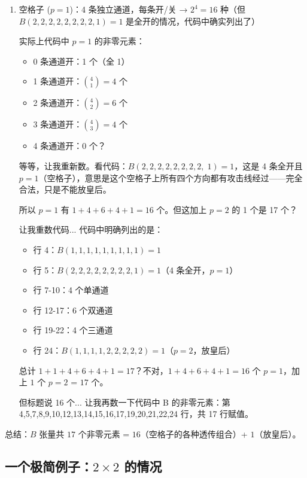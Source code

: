 \documentclass[12pt,a4paper]{article}
\begin{document}
\begin{sumbox}[16 个非零元素 = 15（空格子透传）+ 1（放皇后）]
\begin{enumerate}
  \item 空格子 ($p=1$)：4 条独立通道，每条开/关 → $2^4 = 16$ 种（但 $B(2,2,2,2,2,2,2,2,1)=1$ 是全开的情况，代码中确实列出了）

  实际上代码中 $p=1$ 的非零元素：
  \begin{itemize}
    \item 0 条通道开：1 个（全 1）
    \item 1 条通道开：$\binom{4}{1} = 4$ 个
    \item 2 条通道开：$\binom{4}{2} = 6$ 个
    \item 3 条通道开：$\binom{4}{3} = 4$ 个
    \item 4 条通道开：$0$ 个？
  \end{itemize}

  等等，让我重新数。看代码：$B(2,2,2,2,2,2,2,2,\;1) = 1$，这是 4 条全开且 $p=1$（空格子），意思是这个空格子上所有四个方向都有攻击线经过——完全合法，只是不能放皇后。

  所以 $p=1$ 有 $1 + 4 + 6 + 4 + 1 = 16$ 个。但这加上 $p=2$ 的 1 个是 17 个？

  让我重数代码... 代码中明确列出的是：
  \begin{itemize}
    \item 行 4：$B(1,1,1,1,1,1,1,1,1)=1$
    \item 行 5：$B(2,2,2,2,2,2,2,2,1)=1$（4 条全开，$p=1$）
    \item 行 7-10：4 个单通道
    \item 行 12-17：6 个双通道
    \item 行 19-22：4 个三通道
    \item 行 24：$B(1,1,1,1,2,2,2,2,2)=1$（$p=2$，放皇后）
  \end{itemize}
  总计 $1+1+4+6+4+1 = 17$？不对，$1+4+6+4+1 = 16$ 个 $p=1$，加上 $1$ 个 $p=2$ = $17$ 个。

  但标题说 16 个... 让我再数一下代码中 B 的非零元素：第 4,5,7,8,9,10,12,13,14,15,16,17,19,20,21,22,24 行，共 17 行赋值。
\end{enumerate}

总结：$B$ 张量共 $17$ 个非零元素 = $16$（空格子的各种透传组合）+ $1$（放皇后）。
\end{sumbox}

\subsection{一个极简例子：$2\times 2$ 的情况}
\end{document}
